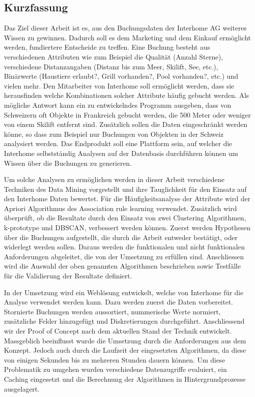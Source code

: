 
\subsection*{Kurzfassung}
Das Ziel dieser Arbeit ist es, aus den Buchungsdaten der Interhome AG weiteres Wissen zu gewinnen. Dadurch soll es dem Marketing und dem Einkauf ermöglicht werden, fundiertere Entscheide zu treffen. Eine Buchung besteht aus verschiedenen Attributen wie zum Beispiel die Qualität (Anzahl Sterne), verschiedene Distanzangaben (Distanz bis zum Meer, Skilift, See, etc.), Binärwerte (Haustiere erlaubt?, Grill vorhanden?, Pool vorhanden?, etc.) und vielen mehr. Den Mitarbeiter von Interhome soll ermöglicht werden, dass sie herausfinden welche Kombinationen solcher Attribute häufig gebucht werden. Als mögliche Antwort kann ein zu entwickelndes Programm ausgeben, dass von Schweizern oft Objekte in Frankreich gebucht werden, die 500 Meter oder weniger von einem Skilift entfernt sind. Zusätzlich sollen die Daten eingeschränkt werden könne, so dass zum Beispiel nur Buchungen von Objekten in der Schweiz analysiert werden. Das Endprodukt soll eine Plattform sein, auf welcher die Interhome selbstständig Analysen auf der Datenbasis durchführen können um Wissen über die Buchungen zu generieren.

Um solche Analysen zu ermöglichen werden in dieser Arbeit verschiedene Techniken des Data Mining vorgestellt und ihre Tauglichkeit für den Einsatz auf den Interhome Daten bewertet. Für die Häufigkeitsanalyse der Attribute wird der Apriori Algorithmus des Association rule learning verwendet. Zusätzlich wird überprüft, ob die Resultate durch den Einsatz von zwei Clustering Algorithmen, k-prototype und DBSCAN, verbessert werden können. Zuerst werden Hypothesen über die Buchungen aufgestellt, die durch die Arbeit entweder bestätigt, oder widerlegt werden sollen. Daraus werden die funktionalen und nicht funktionalen Anforderungen abgeleitet, die von der Umsetzung zu erfüllen sind. Anschliessen wird die Auswahl der oben genannten Algorithmen beschrieben sowie Testfälle für die Validierung der Resultate definiert.  

In der Umsetzung wird ein Weblösung entwickelt, welche von Interhome für die Analyse verwendet werden kann. Dazu werden zuerst die Daten vorbereitet. Stornierte Buchungen werden aussortiert, nummerische Werte normiert, zusätzliche Felder hinzugefügt und Diskretierungen durchgeführt. Anschliessend wir der Proof of Concept nach dem aktuellen Stand der Technik entwickelt. Massgeblich beeinflusst wurde die Umsetzung durch die Anforderungen aus dem Konzept. Jedoch auch durch die  Laufzeit der eingesetzten Algorithmen, da diese von einigen Sekunden bis zu mehreren Stunden dauern können. Um diese Problematik zu umgehen wurden verschiedene Datenzugriffe evaluiert, ein Caching eingesetzt und die Berechnung der Algorithmen in Hintergrundprozesse ausgelagert.

